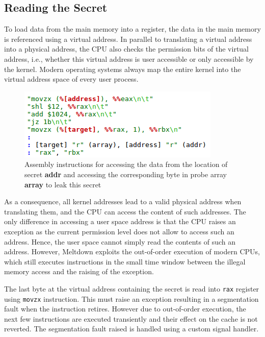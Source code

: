 \documentclass[runningheads]{llncs}
\begin{document}
\subsection{Reading the Secret}
To load data from the main memory into a register, the data in the main memory is referenced using a virtual address. In parallel to translating a virtual address into a physical address, the CPU also checks the permission bits of the virtual address, i.e., whether this virtual address is user accessible or only accessible by the kernel. Modern operating systems always map the entire kernel into the virtual address space of every user process.

\begin{figure}[H]
\centerline{\includegraphics[scale=0.6]{images/asm_part.png}}
\caption{Assembly instructions for accessing the data from the location of secret \textbf{addr} and accessing the corresponding byte in probe array \textbf{array} to leak this secret} \label{asm_part}
\end{figure}

As a consequence, all kernel addresses lead to a valid physical address when translating them, and the CPU can access the content of such addresses. The only difference in accessing a user space address is that the CPU raises an exception as the current permission level does not allow to access such an address. Hence, the user space cannot simply read the contents of such an address. However, Meltdown exploits the out-of-order execution of modern CPUs, which still executes instructions in the small time window between the illegal memory access and the raising of the exception.

The last byte at the virtual address containing the secret is read into \texttt{rax} register using \texttt{movzx} instruction. This must raise an exception resulting in a segmentation fault when the instruction retires. However due to out-of-order execution, the next few instructions are executed transiently and their effect on the cache is not reverted. The segmentation fault raised is handled using a custom signal handler.\\
\end{document}
